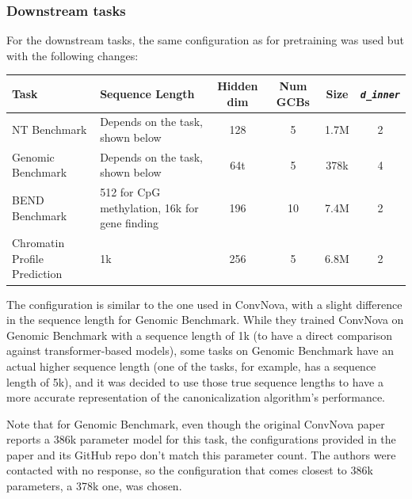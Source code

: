 \documentclass[   ]{article}
\let\oldtexttt\texttt
\renewcommand{\texttt}[1]{\oldtexttt{\itshape #1}}
\begin{document}
\subsubsection{Downstream tasks}\label{sec:appendix_downstream_tasks}

For the downstream tasks, the same configuration as for pretraining was used but with the following changes:

\begin{table}[ht]
	\centering
	\begin{tabularx}{\textwidth}{X X c c c c}
		\toprule
		Task & Sequence Length & Hidden dim & Num GCBs & Size & \texttt{d\_inner} \\
		\midrule
		NT Benchmark & Depends on the task, shown below & 128 & 5 & 1.7M & 2 \\
		Genomic Benchmark & Depends on the task, shown below & 64t & 5 & 378k & 4 \\
		BEND Benchmark & 512 for CpG methylation, 16k for gene finding & 196 & 10 & 7.4M & 2 \\
		Chromatin Profile Prediction & 1k & 256 & 5 & 6.8M & 2 \\
		\bottomrule
	\end{tabularx}
\end{table}

The configuration is similar to the one used in ConvNova, with a slight difference in the sequence length for Genomic Benchmark. While they trained ConvNova on Genomic Benchmark with a sequence length of 1k (to have a direct comparison against transformer-based models), some tasks on Genomic Benchmark have an actual higher sequence length (one of the tasks, for example, has a sequence length of 5k), and it was decided to use those true sequence lengths to have a more accurate representation of the canonicalization algorithm's performance.

Note that for Genomic Benchmark, even though the original ConvNova paper reports a 386k parameter model for this task, the configurations provided in the paper and its GitHub repo don't match this parameter count. The authors were contacted with no response, so the configuration that comes closest to 386k parameters, a 378k one, was chosen.
\end{document}
